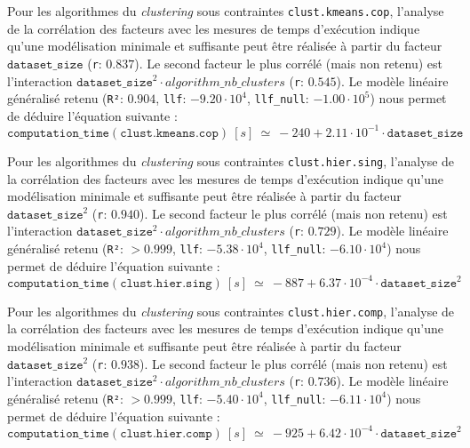 			Pour les algorithmes du \textit{clustering} sous contraintes \texttt{clust.kmeans.cop}, l'analyse de la corrélation des facteurs avec les mesures de temps d'exécution indique qu'une modélisation minimale et suffisante peut être réalisée à partir du facteur $\texttt{dataset\_size}$ (\texttt{r}: $0.837$).
			Le second facteur le plus corrélé (mais non retenu) est l'interaction $\texttt{dataset\_size}^{2} \cdot algorithm\_nb\_clusters$ (\texttt{r}: $0.545$).
			Le modèle linéaire généralisé retenu (\texttt{R²}: $0.904$, \texttt{llf}: $-9.20 \cdot 10^{4}$, \texttt{llf\_null}: $-1.00 \cdot 10^{5}$) nous permet de déduire l'équation suivante :
			\begin{equation}
				\texttt{computation\_time}(\texttt{clust.kmeans.cop})~[s]~
				\simeq~-240 + 2.11 \cdot 10^{-1} \cdot \texttt{dataset\_size}
			\end{equation}
			
			Pour les algorithmes du \textit{clustering} sous contraintes \texttt{clust.hier.sing}, l'analyse de la corrélation des facteurs avec les mesures de temps d'exécution indique qu'une modélisation minimale et suffisante peut être réalisée à partir du facteur $\texttt{dataset\_size}^{2}$ (\texttt{r}: $0.940$).
			Le second facteur le plus corrélé (mais non retenu) est l'interaction $\texttt{dataset\_size}^{2} \cdot algorithm\_nb\_clusters$ (\texttt{r}: $0.729$).
			Le modèle linéaire généralisé retenu (\texttt{R²}: $> 0.999$, \texttt{llf}: $-5.38 \cdot 10^{4}$, \texttt{llf\_null}: $-6.10 \cdot 10^{4}$) nous permet de déduire l'équation suivante :
			\begin{equation}
				\texttt{computation\_time}(\texttt{clust.hier.sing})~[s]~
				\simeq~-887 + 6.37 \cdot 10^{-4} \cdot \texttt{dataset\_size}^{2}
			\end{equation}
			
			Pour les algorithmes du \textit{clustering} sous contraintes \texttt{clust.hier.comp}, l'analyse de la corrélation des facteurs avec les mesures de temps d'exécution indique qu'une modélisation minimale et suffisante peut être réalisée à partir du facteur $\texttt{dataset\_size}^{2}$ (\texttt{r}: $0.938$).
			Le second facteur le plus corrélé (mais non retenu) est l'interaction $\texttt{dataset\_size}^{2} \cdot algorithm\_nb\_clusters$ (\texttt{r}: $0.736$).
			Le modèle linéaire généralisé retenu (\texttt{R²}: $> 0.999$, \texttt{llf}: $-5.40 \cdot 10^{4}$, \texttt{llf\_null}: $-6.11 \cdot 10^{4}$) nous permet de déduire l'équation suivante :
			\begin{equation}
				\texttt{computation\_time}(\texttt{clust.hier.comp})~[s]~
				\simeq~-925 + 6.42 \cdot 10^{-4} \cdot \texttt{dataset\_size}^{2}
			\end{equation}

